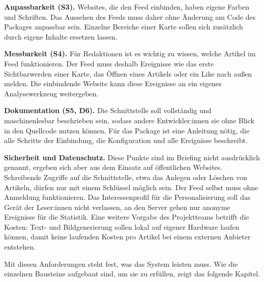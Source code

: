 \textbf{Anpassbarkeit (S3).}
Websites, die den Feed einbinden, haben eigene Farben und Schriften.
Das Aussehen des Feeds muss daher ohne Änderung am Code des Packages anpassbar sein.
Einzelne Bereiche einer Karte sollen sich zusätzlich durch eigene Inhalte ersetzen lassen.

\textbf{Messbarkeit (S4).}
Für Redaktionen ist es wichtig zu wissen, welche Artikel im Feed funktionieren.
Der Feed muss deshalb Ereignisse wie das erste Sichtbarwerden einer Karte, das Öffnen eines Artikels oder ein Like nach außen melden.
Die einbindende Website kann diese Ereignisse an ein eigenes Analysewerkzeug weitergeben.

\textbf{Dokumentation (S5, D6).}
Die Schnittstelle soll vollständig und maschinenlesbar beschrieben sein, sodass andere Entwickler:innen sie ohne Blick in den Quellcode nutzen können.
Für das Package ist eine Anleitung nötig, die alle Schritte der Einbindung, die Konfiguration und alle Ereignisse beschreibt.

\textbf{Sicherheit und Datenschutz.}
Diese Punkte sind im Briefing nicht ausdrücklich genannt, ergeben sich aber aus dem Einsatz auf öffentlichen Websites.
Schreibende Zugriffe auf die Schnittstelle, etwa das Anlegen oder Löschen von Artikeln, dürfen nur mit einem Schlüssel möglich sein.
Der Feed selbst muss ohne Anmeldung funktionieren.
Das Interessenprofil für die Personalisierung soll das Gerät der Leser:innen nicht verlassen, an den Server gehen nur anonyme Ereignisse für die Statistik.
Eine weitere Vorgabe des Projektteams betrifft die Kosten: Text- und Bildgenerierung sollen lokal auf eigener Hardware laufen können, damit keine laufenden Kosten pro Artikel bei einem externen Anbieter entstehen.

Mit diesen Anforderungen steht fest, was das System leisten muss.
Wie die einzelnen Bausteine aufgebaut sind, um sie zu erfüllen, zeigt das folgende Kapitel.
